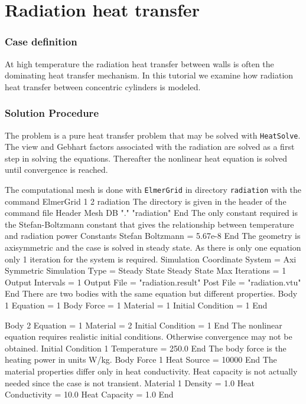 \chapter{Radiation heat transfer}


\subsection*{Case definition}

At high temperature the radiation heat transfer between walls 
is often the dominating heat transfer mechanism. In this
tutorial we examine how radiation heat transfer between 
concentric cylinders is modeled. 


\subsection*{Solution Procedure}

The problem is a pure heat transfer problem that may be solved
with \texttt{HeatSolve}. The view and Gebhart factors 
associated with the radiation are solved as a first step 
in solving the equations. Thereafter the nonlinear heat equation is solved
until convergence is reached.

The computational mesh is done with \texttt{ElmerGrid} in directory \texttt{radiation} 
with the command 
\ttbegin
ElmerGrid 1 2 radiation
\ttend
The directory is given in the header of the command file
\ttbegin
Header
  Mesh DB "." "radiation"
End
\ttend
%
The only constant required is the Stefan-Boltzmann constant that gives the
relationship between temperature and radiation power
\ttbegin
Constants
  Stefan Boltzmann = 5.67e-8
End
\ttend
%
The geometry is axisymmetric and the case is solved in steady state.
As there is only one equation only 1 iteration for the system is required.
\ttbegin
Simulation
  Coordinate System = Axi Symmetric
  Simulation Type = Steady State
  Steady State Max Iterations = 1
  Output Intervals = 1
  Output File = "radiation.result"
  Post File = "radiation.vtu"
End
\ttend
% 
There are two bodies with the same equation but different properties.
\ttbegin
Body 1
  Equation = 1
  Body Force = 1
  Material = 1
  Initial Condition = 1
End

Body 2
  Equation = 1
  Material = 2
  Initial Condition = 1
End
\ttend
%
The nonlinear equation requires realistic initial conditions. Otherwise convergence
may not be obtained.
\ttbegin
Initial Condition 1
  Temperature = 250.0
End
\ttend
The body force is the heating power in units W/kg. 
\ttbegin
Body Force 1
  Heat Source = 10000
End
\ttend
The material properties differ only in heat conductivity. Heat capacity is not
actually needed since the case is not transient.
\ttbegin
Material 1
   Density = 1.0
   Heat Conductivity = 10.0
   Heat Capacity = 1.0
End


